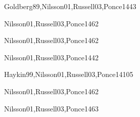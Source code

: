 \begin{syllabus}
    \begin{unit}{\ISAdvancedSearch}{}{Goldberg89,Nilsson01,Russell03,Ponce14}{4}{3}
        \ISAdvancedSearchAllTopics
        \ISAdvancedSearchAllLearningOutcomes
    \end{unit}
    
    \begin{unit}{\ISAdvancedRepresentationandReasoning}{}{Nilsson01,Russell03,Ponce14}{6}{2}
        \ISAdvancedRepresentationandReasoningAllTopics
        \ISAdvancedRepresentationandReasoningAllLearningOutcomes
    \end{unit}
    
    \begin{unit}{\ISAgents}{}{Nilsson01,Russell03,Ponce14}{6}{2}
        \ISAgentsAllTopics
        \ISAgentsAllLearningOutcomes
    \end{unit}
    
    \begin{unit}{\ISNaturalLanguageProcessing}{}{Nilsson01,Russell03,Ponce14}{4}{2}
        \ISNaturalLanguageProcessingAllTopics
        \ISNaturalLanguageProcessingAllLearningOutcomes
    \end{unit}
    
    \begin{unit}{\ISBasicMachineLearning}{}{Haykin99,Nilsson01,Russell03,Ponce14}{10}{5}
        \ISBasicMachineLearningAllTopics
        \ISBasicMachineLearningAllLearningOutcomes
    \end{unit}
    
    \begin{unit}{\ISRobotics}{}{Nilsson01,Russell03,Ponce14}{6}{2}
        \ISRoboticsAllTopics
        \ISRoboticsAllLearningOutcomes
    \end{unit}
    
    \begin{unit}{\ISPerceptionandComputerVision}{}{Nilsson01,Russell03,Ponce14}{6}{3}
        \ISPerceptionandComputerVisionAllTopics
        \ISPerceptionandComputerVisionAllLearningOutcomes
    \end{unit}
    
    \begin{coursebibliography}
    \end{coursebibliography}
    
    \end{syllabus}
    